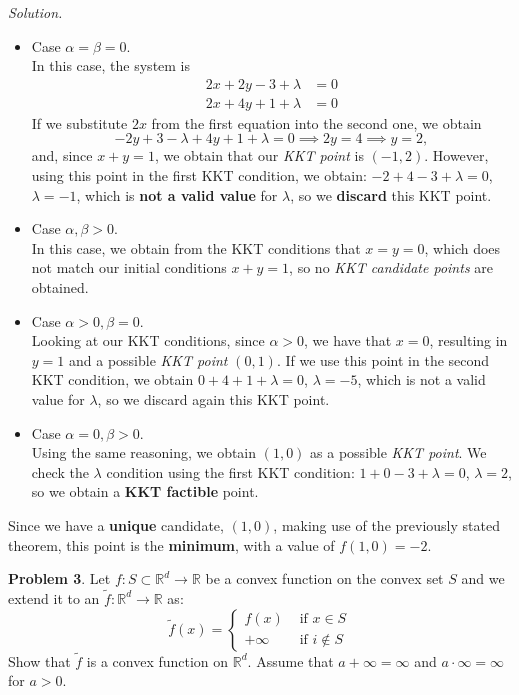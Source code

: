 \documentclass[a4paper]{article}
\newenvironment{problem}[2][Problem]
    { \begin{mdframed}[backgroundcolor=gray!20] \vspace*{0.1cm} \textbf{#1 #2}.}
    {  \end{mdframed}\vspace{0.3cm}}
\newenvironment{solution}
    {\textit{Solution.}\\}
    {}
\newcommand{\R}{\mathbb R}
\begin{document}
\begin{solution}
  \begin{itemize}
    \item Case \(\alpha = \beta = 0\).\\
          In this case, the system is
          \begin{align*}
            2x + 2y - 3 + \lambda & = 0 \\
            2x + 4y +1 + \lambda  & = 0
          \end{align*}
          If we substitute \(2x\) from the first equation into the second one, we obtain
          \[
            -2y +3 - \lambda +4y + 1 + \lambda = 0 \implies 2y = 4  \implies y = 2,
          \]
          and, since \(x+y = 1\), we obtain that our \emph{KKT point} is \((-1,2)\). However, using this point in the first KKT condition, we obtain: \(-2 + 4 - 3 + \lambda = 0\), \(\lambda = -1\), which is \textbf{not a valid value} for \(\lambda\), so we \textbf{discard} this KKT point.
    \item Case \(\alpha, \beta > 0\).\\
          In this case, we obtain from the KKT conditions that \(x=  y = 0\), which does not match our initial conditions \(x+y = 1\), so no \emph{KKT candidate points} are obtained.
    \item Case \(\alpha > 0, \beta = 0\).\\
          Looking at our KKT conditions, since \(\alpha > 0\), we have that \(x = 0\), resulting in \(y=1\) and a possible \emph{KKT point} \((0,1)\). If we use this point in the second KKT condition, we obtain \(0+4+1 + \lambda = 0\), \(\lambda = -5\), which is not a valid value for \(\lambda\), so we discard again this KKT point.
    \item Case \(\alpha = 0, \beta > 0\).\\
          Using the same reasoning, we obtain \((1,0)\) as a possible \emph{KKT point}. We check the \(\lambda\) condition using the first KKT condition: \(1 + 0 -3 + \lambda = 0\), \(\lambda = 2\), so we obtain a \textbf{KKT factible} point.
  \end{itemize}

  Since we have a \textbf{unique} candidate, \((1,0)\), making use of the previously stated theorem, this point is the \textbf{minimum}, with a value of \(f(1,0) = -2\).

\end{solution}

\begin{problem}{3}
Let \(f: S \subset \R^d \to \R\) be a convex function on the convex set \(S\) and we extend it to an \(\tilde f : \R^d \to \R\) as:
\[
  \tilde f(x) = \begin{cases}
    f(x)    & \text{ if } x \in S    \\
    +\infty & \text{ if } i \notin S
  \end{cases}
\]
Show that \(\tilde f\) is a convex function on \(\R^d\). Assume that \(a+\infty = \infty\) and \(a\cdot \infty = \infty\) for \(a > 0\).
\end{problem}
\end{document}
